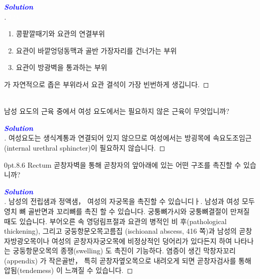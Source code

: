 \documentclass[10pt]{amsart}
\makeatletter
\numberwithin{theorem}{section}
\numberwithin{example}{section}
\newenvironment{prob}[1]
  {\renewcommand\theinnercustompro{#1}\innercustompro}
  {\endinnercustompro}
\newenvironment{solution}
  {\begin{proof}[\textbf{\textcolor{blue}{Solution}}\\]}
  {\end{proof}}
\theoremstyle{definition}
\theoremstyle{remark}
\renewcommand\section{\@startsection{section}{1}%
{0pt}{.8\linespacing\@plus\linespacing}{.6\linespacing}%
{\LARGE\bfseries\color{black}}}
\makeatother
\begin{document}
\begin{solution}

\textcolor{white}{124}

\begin{enumerate}
    \item 콩팥깔때기와 요관의 연결부위
    \item 요관이 바깥엉덩동맥과 골반 가장자리를 건너가는 부위
    \item 요관이 방광벽을 통과하는 부위
    
\end{enumerate}

가 자연적으로 좁은 부위라서 요관 결석이 가장 빈번하게 생깁니다.
\end{solution}


\textcolor{white}{124} \\

\begin{prob}{2}
\textnormal{
남성 요도의 근육 중에서 여성 요도에서는 필요하지 않은 근육이 무엇입니까?}
\end{prob}
\begin{solution}
 여성요도는 
생식계통과 연결되어 있지 않으므로 여성에서는 방굉목에 속요도조임근 
(internal urethral sphincter)이 필요하지 않습니다.

\end{solution}
\section{Rectum}
\begin{prob}{3}
\textnormal{곧창자벽을 통해 곧창자의 앞아래에 있는 어떤  구조를 촉진할 수 있습니까?}
\end{prob}
\begin{solution}
남성의 전립샘과 정액샘， 여성의 자궁목을 촉진할 수 있습니디ㅏ. 남성과 여성 모두 영치 뼈 골반면과 꼬리뼈를 촉진 할 수 있습니다.  궁퉁뼈가시와 궁퉁뼈결절이 만져질 때도 있습니다. 부어오른 속 
영덩림프절과 요관의 병적인 비 후(pathological thickening), 그리고 궁둥항문오목고름집 (ischioanal abscess, 416 쪽)과 남성의 곧창자방광오목이나 여성의 곧창자자궁오목에 비정상적인 덩어리가 있다든지 하여 나타나는 궁둥항문오목의 종쟁(swelling) 도 촉진이 기능하다. 염증이 생긴 막창자꼬리 (appendix) 가 작은골반， 특히 곧창자옆오목으로 내려오게  되면 곧창자검사를 통해 압됨(tendemess) 이 느껴질 수 있습니다.

\end{solution}
\end{document}
